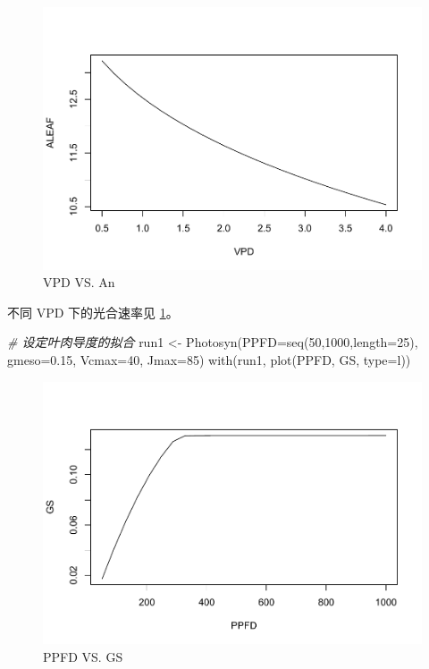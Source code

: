 \documentclass[
]{krantz}
\makeatletter
\newenvironment{Shaded}{\begin{snugshade}}{\end{snugshade}}
\newcommand{\AttributeTok}[1]{\textcolor[rgb]{0.77,0.63,0.00}{#1}}
\newcommand{\CommentTok}[1]{\textcolor[rgb]{0.56,0.35,0.01}{\textit{#1}}}
\newcommand{\DecValTok}[1]{\textcolor[rgb]{0.00,0.00,0.81}{#1}}
\newcommand{\FloatTok}[1]{\textcolor[rgb]{0.00,0.00,0.81}{#1}}
\newcommand{\FunctionTok}[1]{\textcolor[rgb]{0.00,0.00,0.00}{#1}}
\newcommand{\NormalTok}[1]{#1}
\newcommand{\OtherTok}[1]{\textcolor[rgb]{0.56,0.35,0.01}{#1}}
\newcommand{\StringTok}[1]{\textcolor[rgb]{0.31,0.60,0.02}{#1}}
\newenvironment{kframe}{%
\medskip{}
\setlength{\fboxsep}{.8em}
 \def\at@end@of@kframe{}%
 \ifinner\ifhmode%
  \def\at@end@of@kframe{\end{minipage}}%
  \begin{minipage}{\columnwidth}%
 \fi\fi%
 \def\FrameCommand##1{\hskip\@totalleftmargin \hskip-\fboxsep
 \colorbox{shadecolor}{##1}\hskip-\fboxsep
     \hskip-\linewidth \hskip-\@totalleftmargin \hskip\columnwidth}%
 \MakeFramed {\advance\hsize-\width
   \@totalleftmargin\z@ \linewidth\hsize
   \@setminipage}}%
 {\par\unskip\endMakeFramed%
 \at@end@of@kframe}
\renewenvironment{Shaded}{\begin{kframe}}{\end{kframe}}
\makeatother
\begin{document}
\begin{figure}
\centering
\includegraphics{bookdown_files/figure-latex/vpd-1.pdf}
\caption{\label{fig:vpd}VPD VS. An}
\end{figure}

不同 VPD 下的光合速率见 \ref{fig:vpd}。

\begin{Shaded}
\begin{Highlighting}[]
\CommentTok{\# 设定叶肉导度的拟合}
\NormalTok{run1 }\OtherTok{\textless{}{-}} \FunctionTok{Photosyn}\NormalTok{(}\AttributeTok{PPFD=}\FunctionTok{seq}\NormalTok{(}\DecValTok{50}\NormalTok{,}\DecValTok{1000}\NormalTok{,}\AttributeTok{length=}\DecValTok{25}\NormalTok{), }
                 \AttributeTok{gmeso=}\FloatTok{0.15}\NormalTok{, }\AttributeTok{Vcmax=}\DecValTok{40}\NormalTok{, }\AttributeTok{Jmax=}\DecValTok{85}\NormalTok{)}
\FunctionTok{with}\NormalTok{(run1, }\FunctionTok{plot}\NormalTok{(PPFD, GS, }\AttributeTok{type=}\StringTok{\textquotesingle{}l\textquotesingle{}}\NormalTok{))}
\end{Highlighting}
\end{Shaded}

\begin{figure}
\centering
\includegraphics{bookdown_files/figure-latex/ppfd-1.pdf}
\caption{\label{fig:ppfd-1}PPFD VS. GS}
\end{figure}
\end{document}
